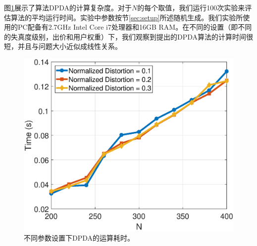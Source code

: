 图\ref{fg:complexity}展示了算法DPDA的计算复杂度。对于$N$的每个取值，我们运行100次实验来评估算法的平均运行时间。实验中参数按节\ref{sec:setup}所述随机生成。我们实验所使用的PC配备有2.7GHz Intel Core i7处理器和16GB RAM。在不同的设置（即不同的失真度级别，出价和用户权重）下，我们观察到提出的DPDA算法的计算时间很短，并且与问题大小近似成线性关系。

	\begin{figure}[h!]
		\vspace{-0.2cm}
		\centering
		\includegraphics[scale=0.52]{./pic/complexity.eps}
		\vspace{-0.2cm}
		\caption{不同参数设置下DPDA的运算耗时。}\label{fg:complexity}
		\vspace{-0.3cm}
	\end{figure}

